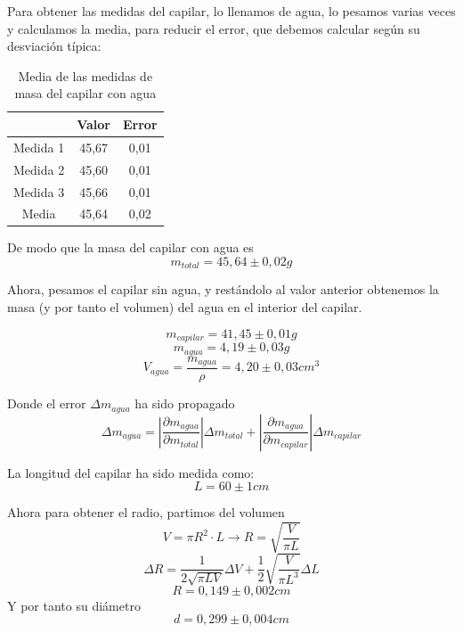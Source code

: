 \documentclass[a4paper,12pt,spanish]{article}
\begin{document}
	\vspace{\baselineskip}
	
	
	Para obtener las medidas del capilar, lo llenamos de agua, lo pesamos varias veces y calculamos la media, para reducir el error, que debemos calcular según su desviación típica:
	
	
	\begin{table}[H]
		\centering
		\begin{tabular}{c|c|c|}
			\cline{2-3}
			& Valor & Error \\ \hline
			\multicolumn{1}{|c|}{Medida 1} & 45,67 & 0,01 \\ \hline
			\multicolumn{1}{|c|}{Medida 2} & 45,60 & 0,01 \\ \hline
			\multicolumn{1}{|c|}{Medida 3} & 45,66 & 0,01 \\ \hline\hline
			\multicolumn{1}{|c|}{Media} & 45,64 & 0,02 \\ \hline
		\end{tabular}
	\caption{Media de las medidas de masa del capilar con agua}
	\end{table}
	
	
	De modo que la masa del capilar con agua es 
	\[ m_{total} = 45,64 \pm 0,02 \si{g} \]
	
	Ahora, pesamos el capilar sin agua, y restándolo al valor anterior obtenemos la masa (y por tanto el volumen) del agua en el interior del capilar.
	

	\[m_{capilar} = 41,45\pm 0,01 \si{g}\]
	\[ m_{agua} = 4,19 \pm 0,03 \si{g}\]
	\[V_{agua} = \frac{m_{agua}}{\rho} = 4,20 \pm 0,03 \si{cm^3}\]
	
	Donde el error $\Delta m_{agua}$ ha sido propagado
	\[ \Delta m_{agua} = \left|\frac{\partial m_{agua}}{\partial m_{total}}\right|\Delta m_{total} + \left|\frac{\partial m_{agua}}{\partial m_{capilar}}\right|\Delta m_{capilar}
	\]
	
	\vspace{\baselineskip}
	
	La longitud del capilar ha sido medida como:
	\[L = 60\pm 1\si{cm} \]
	
	
	
	
	\vspace{\baselineskip}
	
	
	
	
	
	Ahora para obtener el radio, partimos del volumen
	\[V = \pi R^2 \cdot L \longrightarrow R = \sqrt{\frac{V}{\pi L}}\]
	\[ \Delta R = \frac{1}{2\sqrt{\pi L V}} \Delta V + \frac{1}{2}\sqrt{\frac{V}{\pi L^3}}\Delta L
	\]
	\[ R = 0,149 \pm 0,002 \si{cm}
	\]
	Y por tanto su diámetro
	\[ d = 0,299\pm 0,004 \si{cm}
	\]
	
\end{document}
